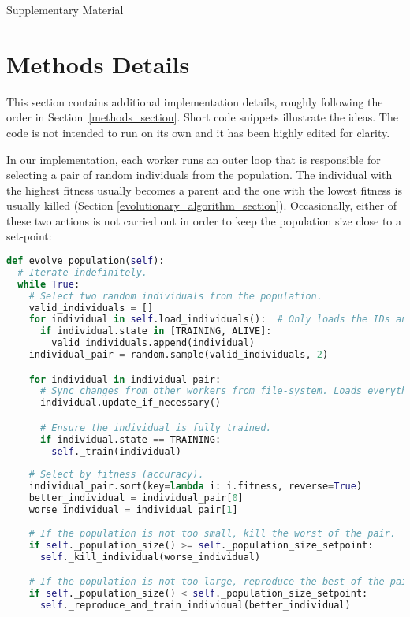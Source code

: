 \documentclass{article}
\begin{document}




\FloatBarrier
\clearpage
\renewcommand{\figurename}{Supplementary Figure}
\renewcommand{\tablename}{Supplementary Table}
\renewcommand{\thesection}{S\arabic{section}}
\setcounter{section}{0}
\setcounter{figure}{0}
\setcounter{table}{0}
\onecolumn
{}

{\LARGE Supplementary Material}



\section{Methods Details}


\label{methods_supplementary_section}

This section contains additional implementation details, roughly following the order in Section~\ref{methods_section}. Short code snippets illustrate the ideas. The code is not intended to run on its own and it has been highly edited for clarity.

In our implementation, each worker runs an outer loop that is responsible for selecting a pair of random individuals from the population. The individual with the highest fitness usually becomes a parent and the one with the lowest fitness is usually killed (Section \ref{evolutionary_algorithm_section}). Occasionally, either of these two actions is not carried out in order to keep the population size close to a set-point:
\smallskip
\begin{lstlisting}[language=Python]
def evolve_population(self):
  # Iterate indefinitely.
  while True:
    # Select two random individuals from the population.
    valid_individuals = []
    for individual in self.load_individuals():  # Only loads the IDs and states.
      if individual.state in [TRAINING, ALIVE]:
        valid_individuals.append(individual)
    individual_pair = random.sample(valid_individuals, 2)

    for individual in individual_pair:
      # Sync changes from other workers from file-system. Loads everything else.
      individual.update_if_necessary()

      # Ensure the individual is fully trained.
      if individual.state == TRAINING:
        self._train(individual)
        
    # Select by fitness (accuracy).
    individual_pair.sort(key=lambda i: i.fitness, reverse=True)
    better_individual = individual_pair[0]
    worse_individual = individual_pair[1]
    
    # If the population is not too small, kill the worst of the pair.
    if self._population_size() >= self._population_size_setpoint:
      self._kill_individual(worse_individual)

    # If the population is not too large, reproduce the best of the pair.
    if self._population_size() < self._population_size_setpoint:
      self._reproduce_and_train_individual(better_individual)
\end{lstlisting}
\end{document}
